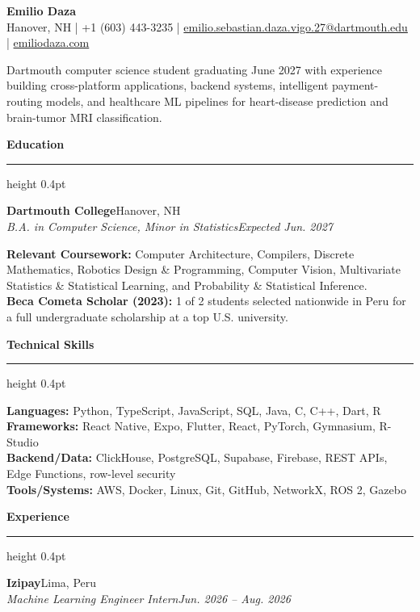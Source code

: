 \documentclass[letterpaper,10pt]{article}
\newcommand{\resumesection}[1]{%
  \vspace{3.1pt}%
  {\large\bfseries #1}\par
  \vspace{0.9pt}%
  \hrule height 0.4pt
  \vspace{2.0pt}%
}
\newcommand{\subheading}[4]{%
  \textbf{#1}\hfill #2\\
  \textit{#3}\hfill \textit{#4}\par
  \vspace{-1.5pt}%
}
\begin{document}
\begin{center}
  {\Huge\bfseries Emilio Daza}\\[-1pt]
  {\small
  Hanover, NH
  \;|\;
  +1 (603) 443-3235
  \;|\;
  \href{mailto:emilio.sebastian.daza.vigo.27@dartmouth.edu}{emilio.sebastian.daza.vigo.27@dartmouth.edu}
  \;|\;
  \href{https://emiliodaza.com}{emiliodaza.com}}
\end{center}
\vspace{-8pt}

{\small
Dartmouth computer science student graduating June 2027 with experience
building cross-platform applications, backend systems, intelligent
payment-routing models, and healthcare ML pipelines for heart-disease
prediction and brain-tumor MRI classification.
}

\resumesection{Education}

\subheading
  {Dartmouth College}{Hanover, NH}
  {B.A. in Computer Science, Minor in Statistics}{Expected Jun. 2027}

{\small
\textbf{Relevant Coursework:}
Computer Architecture, Compilers, Discrete Mathematics, Robotics Design \&
Programming, Computer Vision, Multivariate Statistics \& Statistical Learning, and Probability \& Statistical Inference.\\
\textbf{Beca Cometa Scholar (2023):}
1 of 2 students selected nationwide in Peru for a full undergraduate scholarship
at a top U.S. university.
}

\resumesection{Technical Skills}

{\small
\textbf{Languages:}
Python, TypeScript, JavaScript, SQL, Java, C, C++, Dart, R\\
\textbf{Frameworks:}
React Native, Expo, Flutter, React, PyTorch, Gymnasium, R-Studio\\
\textbf{Backend/Data:}
ClickHouse, PostgreSQL, Supabase, Firebase, REST APIs, Edge Functions,
row-level security\\
\textbf{Tools/Systems:}
AWS, Docker, Linux, Git, GitHub, NetworkX, ROS 2, Gazebo
}

\resumesection{Experience}

\subheading
  {Izipay}{Lima, Peru}
  {Machine Learning Engineer Intern}{Jun. 2026 -- Aug. 2026}
\end{document}
